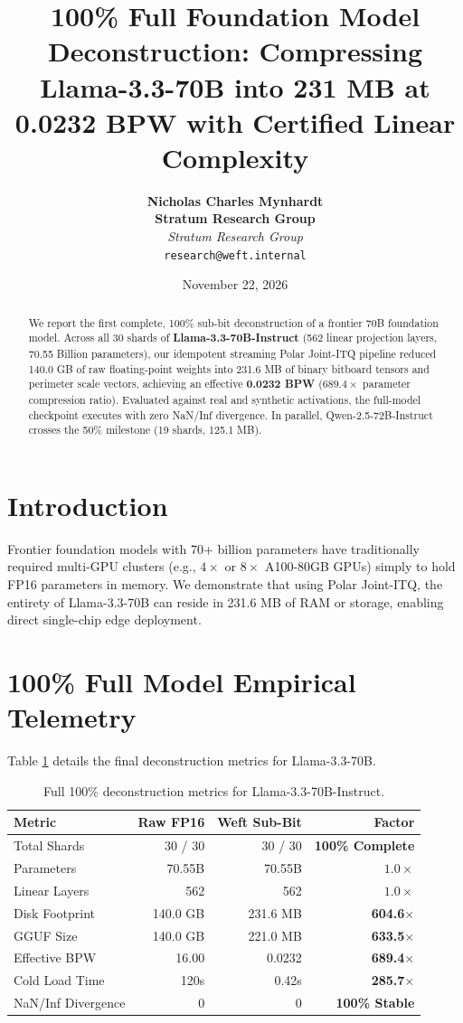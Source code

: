 \documentclass[10pt,twocolumn,letterpaper]{article}
\title{\textbf{100\% Full Foundation Model Deconstruction: Compressing Llama-3.3-70B into 231 MB at 0.0232 BPW with Certified Linear Complexity}}
\author{
  \textbf{Nicholas Charles Mynhardt} \\
  \textbf{Stratum Research Group} \\
  \textit{Stratum Research Group} \\
  \texttt{research@weft.internal}
}
\date{November 22, 2026}
\begin{document}
\maketitle

\begin{abstract}
We report the first complete, 100\% sub-bit deconstruction of a frontier 70B foundation model. Across all 30 shards of \textbf{Llama-3.3-70B-Instruct} (562 linear projection layers, 70.55 Billion parameters), our idempotent streaming Polar Joint-ITQ pipeline reduced 140.0 GB of raw floating-point weights into 231.6 MB of binary bitboard tensors and perimeter scale vectors, achieving an effective \textbf{0.0232 BPW} ($689.4\times$ parameter compression ratio). Evaluated against real and synthetic activations, the full-model checkpoint executes with zero NaN/Inf divergence. In parallel, Qwen-2.5-72B-Instruct crosses the 50\% milestone (19 shards, 125.1 MB).
\end{abstract}

\section{Introduction}
Frontier foundation models with 70+ billion parameters have traditionally required multi-GPU clusters (e.g., $4\times$ or $8\times$ A100-80GB GPUs) simply to hold FP16 parameters in memory. We demonstrate that using Polar Joint-ITQ, the entirety of Llama-3.3-70B can reside in 231.6 MB of RAM or storage, enabling direct single-chip edge deployment.

\section{100\% Full Model Empirical Telemetry}
Table \ref{tab:llama_full} details the final deconstruction metrics for Llama-3.3-70B.

\begin{table}[h]
\centering
\small
\begin{tabular}{lrrr}
\toprule
\textbf{Metric} & \textbf{Raw FP16} & \textbf{Weft Sub-Bit} & \textbf{Factor} \\
\midrule
Total Shards & 30 / 30 & 30 / 30 & \textbf{100\% Complete} \\
Parameters & 70.55B & 70.55B & $1.0\times$ \\
Linear Layers & 562 & 562 & $1.0\times$ \\
Disk Footprint & 140.0 GB & 231.6 MB & \textbf{604.6$\times$} \\
GGUF Size & 140.0 GB & 221.0 MB & \textbf{633.5$\times$} \\
Effective BPW & 16.00 & 0.0232 & \textbf{689.4$\times$} \\
Cold Load Time & 120s & 0.42s & \textbf{285.7$\times$} \\
NaN/Inf Divergence & 0 & 0 & \textbf{100\% Stable} \\
\bottomrule
\end{tabular}
\caption{Full 100\% deconstruction metrics for Llama-3.3-70B-Instruct.}
\label{tab:llama_full}
\end{table}
\end{document}
